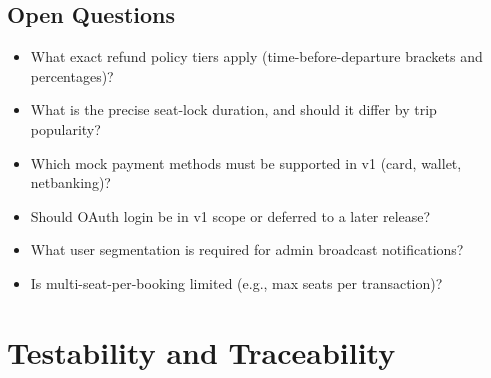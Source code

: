 \documentclass[11pt,a4paper]{article}
\begin{document}
\subsection{Open Questions}
\begin{itemize}[leftmargin=1.4em]
  \item What exact refund policy tiers apply (time-before-departure brackets and percentages)?
  \item What is the precise seat-lock duration, and should it differ by trip popularity?
  \item Which mock payment methods must be supported in v1 (card, wallet, netbanking)?
  \item Should OAuth login be in v1 scope or deferred to a later release?
  \item What user segmentation is required for admin broadcast notifications?
  \item Is multi-seat-per-booking limited (e.g., max seats per transaction)?
\end{itemize}

\section{Testability and Traceability}
\end{document}
